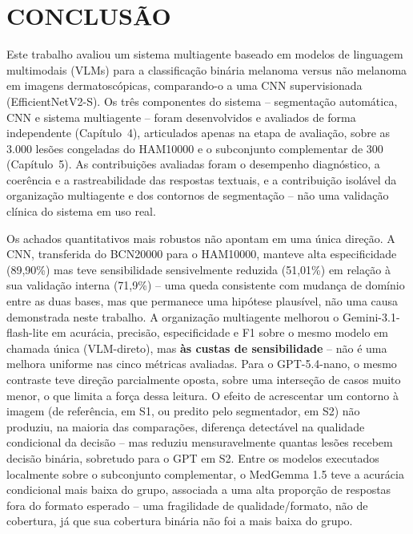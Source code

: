 \chapter[CONCLUSÃO]{CONCLUSÃO}
\label{chap:conclusao}

Este trabalho avaliou um sistema multiagente baseado em modelos de linguagem multimodais (VLMs) para a classificação binária melanoma versus não melanoma em imagens dermatoscópicas, comparando-o a uma CNN supervisionada (EfficientNetV2-S). Os três componentes do sistema -- segmentação automática, CNN e sistema multiagente -- foram desenvolvidos e avaliados de forma independente (Capítulo~4), articulados apenas na etapa de avaliação, sobre as 3.000 lesões congeladas do HAM10000 e o subconjunto complementar de 300 (Capítulo~5). As contribuições avaliadas foram o desempenho diagnóstico, a coerência e a rastreabilidade das respostas textuais, e a contribuição isolável da organização multiagente e dos contornos de segmentação -- não uma validação clínica do sistema em uso real.

Os achados quantitativos mais robustos não apontam em uma única direção. A CNN, transferida do BCN20000 para o HAM10000, manteve alta especificidade (89,90\%) mas teve sensibilidade sensivelmente reduzida (51,01\%) em relação à sua validação interna (71,9\%) -- uma queda consistente com mudança de domínio entre as duas bases, mas que permanece uma hipótese plausível, não uma causa demonstrada neste trabalho. A organização multiagente melhorou o Gemini-3.1-flash-lite em acurácia, precisão, especificidade e F1 sobre o mesmo modelo em chamada única (VLM-direto), mas \textbf{às custas de sensibilidade} -- não é uma melhora uniforme nas cinco métricas avaliadas. Para o GPT-5.4-nano, o mesmo contraste teve direção parcialmente oposta, sobre uma interseção de casos muito menor, o que limita a força dessa leitura. O efeito de acrescentar um contorno à imagem (de referência, em S1, ou predito pelo segmentador, em S2) não produziu, na maioria das comparações, diferença detectável na qualidade condicional da decisão -- mas reduziu mensuravelmente quantas lesões recebem decisão binária, sobretudo para o GPT em S2. Entre os modelos executados localmente sobre o subconjunto complementar, o MedGemma 1.5 teve a acurácia condicional mais baixa do grupo, associada a uma alta proporção de respostas fora do formato esperado -- uma fragilidade de qualidade/formato, não de cobertura, já que sua cobertura binária não foi a mais baixa do grupo.

